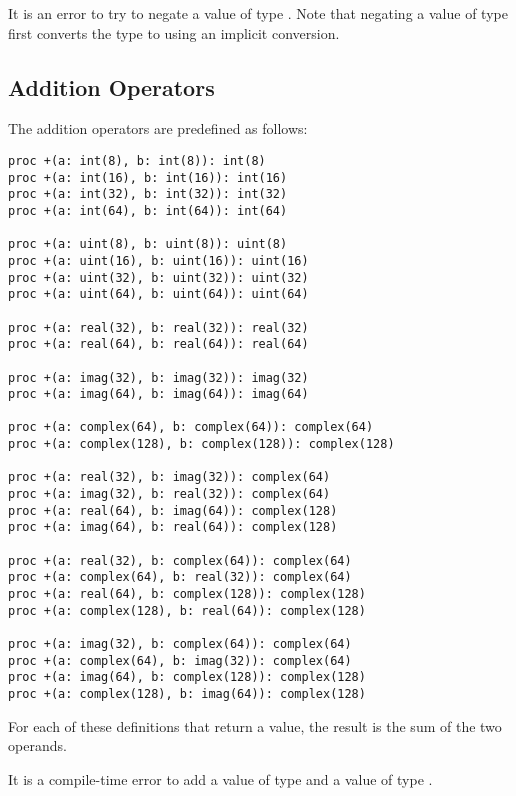 It is an error to try to negate a value of type .  Note
that negating a value of type  first converts the type
to  using an implicit conversion.

\pagebreak
\subsection{Addition Operators}
\label{Addition_Operators}

The addition operators are predefined as follows:
\begin{chapel}
\begin{verbatim}
proc +(a: int(8), b: int(8)): int(8)
proc +(a: int(16), b: int(16)): int(16)
proc +(a: int(32), b: int(32)): int(32)
proc +(a: int(64), b: int(64)): int(64)

proc +(a: uint(8), b: uint(8)): uint(8)
proc +(a: uint(16), b: uint(16)): uint(16)
proc +(a: uint(32), b: uint(32)): uint(32)
proc +(a: uint(64), b: uint(64)): uint(64)

proc +(a: real(32), b: real(32)): real(32)
proc +(a: real(64), b: real(64)): real(64)

proc +(a: imag(32), b: imag(32)): imag(32)
proc +(a: imag(64), b: imag(64)): imag(64)

proc +(a: complex(64), b: complex(64)): complex(64)
proc +(a: complex(128), b: complex(128)): complex(128)

proc +(a: real(32), b: imag(32)): complex(64)
proc +(a: imag(32), b: real(32)): complex(64)
proc +(a: real(64), b: imag(64)): complex(128)
proc +(a: imag(64), b: real(64)): complex(128)

proc +(a: real(32), b: complex(64)): complex(64)
proc +(a: complex(64), b: real(32)): complex(64)
proc +(a: real(64), b: complex(128)): complex(128)
proc +(a: complex(128), b: real(64)): complex(128)

proc +(a: imag(32), b: complex(64)): complex(64)
proc +(a: complex(64), b: imag(32)): complex(64)
proc +(a: imag(64), b: complex(128)): complex(128)
proc +(a: complex(128), b: imag(64)): complex(128)
\end{verbatim}
\end{chapel}
For each of these definitions that return a value, the result is the
sum of the two operands.

It is a compile-time error to add a value of type  and
a value of type .

